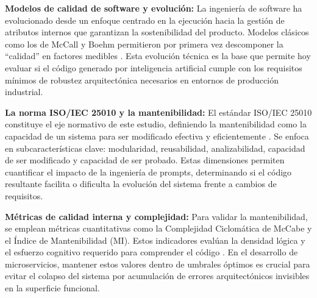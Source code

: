 
\begin{listaIV}
\item \textbf{Modelos de calidad de software y evolución:} La ingeniería de software ha evolucionado desde un enfoque centrado en la ejecución hacia la gestión de atributos internos que garantizan la sostenibilidad del producto. Modelos clásicos como los de McCall y Boehm permitieron por primera vez descomponer la ``calidad'' en factores medibles \cite{pardo2024mantenibilidad}. Esta evolución técnica es la base que permite hoy evaluar si el código generado por inteligencia artificial cumple con los requisitos mínimos de robustez arquitectónica necesarios en entornos de producción industrial.

\item \textbf{La norma ISO/IEC 25010 y la mantenibilidad:} El estándar ISO/IEC 25010 constituye el eje normativo de este estudio, definiendo la mantenibilidad como la capacidad de un sistema para ser modificado efectiva y eficientemente \cite{iso25010}. Se enfoca en subcaracterísticas clave: modularidad, reusabilidad, analizabilidad, capacidad de ser modificado y capacidad de ser probado. Estas dimensiones permiten cuantificar el impacto de la ingeniería de prompts, determinando si el código resultante facilita o dificulta la evolución del sistema frente a cambios de requisitos.



\item \textbf{Métricas de calidad interna y complejidad:} Para validar la mantenibilidad, se emplean métricas cuantitativas como la Complejidad Ciclomática de McCabe y el Índice de Mantenibilidad (MI). Estos indicadores evalúan la densidad lógica y el esfuerzo cognitivo requerido para comprender el código \cite{asfandyar2024evaluating}. En el desarrollo de microservicios, mantener estos valores dentro de umbrales óptimos es crucial para evitar el colapso del sistema por acumulación de errores arquitectónicos invisibles en la superficie funcional.
\end{listaIV}


